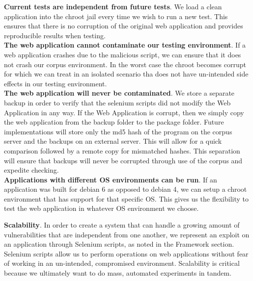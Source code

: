 \documentclass[letterpaper,twocolumn,10pt]{article}
\begin{document}
{\bf Current tests are independent from future tests}.  We load a clean application into the chroot jail every time we wish to run a new test.  This ensures that there is no corruption of the original web application and provides reproducible results when testing.\\

{\bf The web application cannot contaminate our testing environment}.  If a web application crashes due to the malicious script, we can ensure that it does not crash our corpus environment.  In the worst case the chroot becomes corrupt for which we can treat in an isolated scenario tha does not have un-intended side effects in our testing environment.  \\

{\bf The web application will never be contaminated}.  We store a separate backup in order to verify that the selenium scripts did not modify the Web Application in any way.  If the Web Application is corrupt, then we simply copy the web application from the backup folder to the package folder.  Future implementations will store only the md5 hash of the program on the corpus server and the backups on an external server.  This will allow for a quick comparison followed by a remote copy for mismatched hashes.  This separation will ensure that backups will never be corrupted through use of the corpus and expedite checking.  \\

{\bf Applications with different OS environments can be run}.  If an application was built for debian 6 as opposed to debian 4, we can setup a chroot environment that has support for that specific OS.  This gives us the flexibility to test the web application in whatever OS environment we choose.

{\bf Scalability}.  In order to create a system that can handle a growing amount of vulnerabilities that are independent from one another, we represent an exploit on an application through  Selenium scripts, as noted in the Framework section.  Selenium scripts allow us to perform operations on web applications without fear of working in an un-intended, compromised environment.  Scalability is critical because we ultimately want to do mass, automated experiments in tandem. \\
\end{document}
